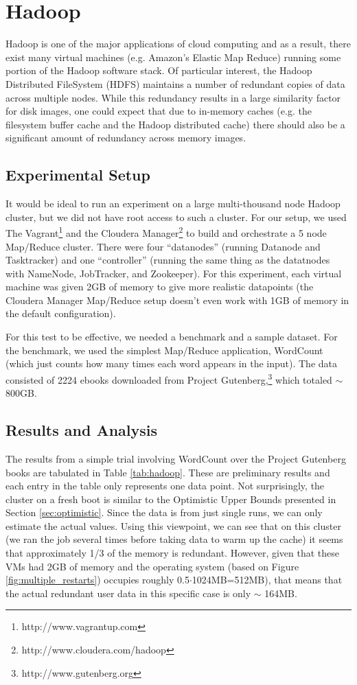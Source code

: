 \documentclass{acm_proc_article-sp}
\begin{document}
\section{Hadoop}
Hadoop is one of the major applications of cloud computing and as a result, there exist many virtual machines (e.g. Amazon's Elastic Map Reduce) running some portion of the Hadoop software stack.  Of particular interest, the Hadoop Distributed FileSystem (HDFS) maintains a number of redundant copies of data across multiple nodes.  While this redundancy results in a large similarity factor for disk images, one could expect that due to in-memory caches (e.g. the filesystem buffer cache and the Hadoop distributed cache) there should also be a significant amount of redundancy across memory images.  

\subsection{Experimental Setup}
It would be ideal to run an experiment on a  large multi-thousand node Hadoop cluster, but we did not have root access to such a cluster.  For our setup, we used The Vagrant\footnote{http://www.vagrantup.com} and the Cloudera Manager\footnote{http://www.cloudera.com/hadoop} to build and orchestrate a 5 node Map/Reduce cluster.  There were four ``datanodes'' (running Datanode and Tasktracker) and one ``controller'' (running the same thing as the datatnodes with NameNode, JobTracker, and Zookeeper).  For this experiment, each virtual machine was given 2GB of memory to give more realistic datapoints (the Cloudera Manager Map/Reduce setup doesn't even work with 1GB of memory in the default configuration).

For this test to be effective, we needed a benchmark and a sample dataset.  For the benchmark, we used the simplest Map/Reduce application, WordCount (which just counts how many times each word appears in the input).  The data consisted of 2224 ebooks downloaded from Project Gutenberg,\footnote{http://www.gutenberg.org} which totaled $\sim$ 800GB.

\subsection{Results and Analysis}\label{sec:hadoop_results}
The results from a simple trial involving WordCount over the Project Gutenberg books are tabulated in Table \ref{tab:hadoop}.  These are preliminary results and each entry in the table only represents one data point.  Not surprisingly, the cluster on a fresh boot is similar to the Optimistic Upper Bounds presented in Section \ref{sec:optimistic}.  Since the data is from just single runs, we can only estimate the actual values.  Using this viewpoint, we can see that on this cluster (we ran the job several times before taking data to warm up the cache) it seems that approximately 1/3 of the memory is redundant.  However, given that these VMs had 2GB of memory and the operating system (based on Figure \ref{fig:multiple_restarts}) occupies roughly 0.5$\cdot$1024MB=512MB), that means that the actual redundant user data in this specific case is only $\sim$ 164MB.
\end{document}
